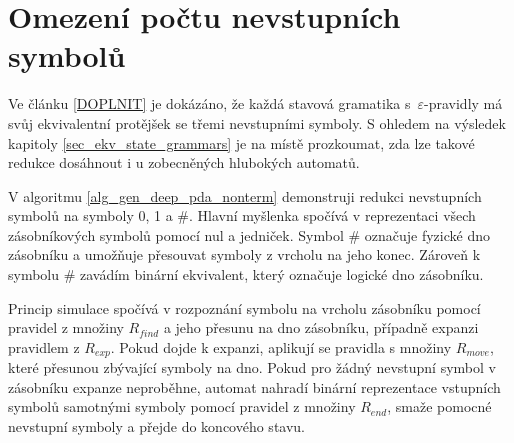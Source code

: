 \section{Omezení počtu nevstupních symbolů}


Ve článku \ref{DOPLNIT} je dokázáno, že každá stavová gramatika s~$\varepsilon$-pravidly má svůj ekvivalentní protějšek se třemi nevstupními symboly. S ohledem na výsledek kapitoly \ref{sec_ekv_state_grammars} je na místě prozkoumat, zda lze takové redukce dosáhnout i u zobecněných hlubokých automatů.

V algoritmu \ref{alg_gen_deep_pda_nonterm} demonstruji redukci nevstupních symbolů na symboly 0, 1 a \#. Hlavní myšlenka spočívá v reprezentaci všech zásobníkových symbolů pomocí nul a jedniček. Symbol \# označuje fyzické dno zásobníku a umožňuje přesouvat symboly z vrcholu na jeho konec. Zároveň k symbolu \# zavádím binární ekvivalent, který označuje logické dno zásobníku. 

Princip simulace spočívá v rozpoznání symbolu na vrcholu zásobníku pomocí pravidel z množiny $R_{find}$ a jeho přesunu na dno zásobníku, případně expanzi pravidlem z $R_{exp}$. Pokud dojde k expanzi, aplikují se pravidla s množiny $R_{move}$, které přesunou zbývající symboly na dno. Pokud pro žádný nevstupní symbol v zásobníku expanze neproběhne, automat nahradí binární reprezentace vstupních symbolů samotnými symboly pomocí pravidel z množiny $R_{end}$, smaže pomocné nevstupní symboly a přejde do koncového stavu.

